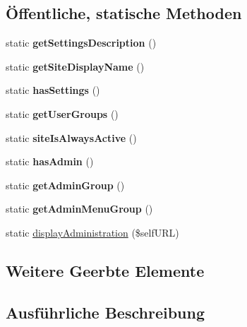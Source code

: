 \subsection*{Öffentliche, statische Methoden}
\begin{DoxyCompactItemize}
\item 
\mbox{\label{classindex_a82768a6cc17fcd2419aa3c8f1a7572ad}} 
static {\bfseries get\+Settings\+Description} ()
\item 
\mbox{\label{classindex_afa5a388bc659116666c999fc0bd9d79f}} 
static {\bfseries get\+Site\+Display\+Name} ()
\item 
\mbox{\label{classindex_ab26f7bf23d9bf6b5fc18f0b20e6d562a}} 
static {\bfseries has\+Settings} ()
\item 
\mbox{\label{classindex_aa0151abf71aa2c450600c8a85c298578}} 
static {\bfseries get\+User\+Groups} ()
\item 
\mbox{\label{classindex_ace3f1de9b012f42708160d72f114cf3b}} 
static {\bfseries site\+Is\+Always\+Active} ()
\item 
\mbox{\label{classindex_a7c29c33ead3ce95bdb1f492c38d8e077}} 
static {\bfseries has\+Admin} ()
\item 
\mbox{\label{classindex_a6ac249db8c91e56294b5e122e9325ec3}} 
static {\bfseries get\+Admin\+Group} ()
\item 
\mbox{\label{classindex_a8c4dc5dd89c88ae3b9b2cdc7c6576f16}} 
static {\bfseries get\+Admin\+Menu\+Group} ()
\item 
static \mbox{\hyperlink{classindex_a1bcd320add31b44179fb685000187ba6}{display\+Administration}} (\$self\+U\+RL)
\end{DoxyCompactItemize}
\subsection*{Weitere Geerbte Elemente}


\subsection{Ausführliche Beschreibung}


